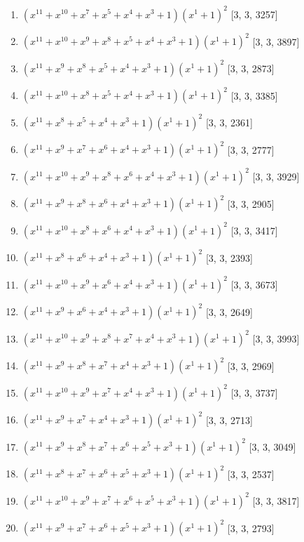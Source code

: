 \documentclass[10pt,twocolumn]{article}
\begin{document}
\begin{enumerate}
\item $(x^{11} + x^{10} + x^{7} + x^{5} + x^{4} + x^{3} + 1)(x^{1} + 1)^{2}$  [3, 3, 3257]
\item $(x^{11} + x^{10} + x^{9} + x^{8} + x^{5} + x^{4} + x^{3} + 1)(x^{1} + 1)^{2}$  [3, 3, 3897]
\item $(x^{11} + x^{9} + x^{8} + x^{5} + x^{4} + x^{3} + 1)(x^{1} + 1)^{2}$  [3, 3, 2873]
\item $(x^{11} + x^{10} + x^{8} + x^{5} + x^{4} + x^{3} + 1)(x^{1} + 1)^{2}$  [3, 3, 3385]
\item $(x^{11} + x^{8} + x^{5} + x^{4} + x^{3} + 1)(x^{1} + 1)^{2}$  [3, 3, 2361]
\item $(x^{11} + x^{9} + x^{7} + x^{6} + x^{4} + x^{3} + 1)(x^{1} + 1)^{2}$  [3, 3, 2777]
\item $(x^{11} + x^{10} + x^{9} + x^{8} + x^{6} + x^{4} + x^{3} + 1)(x^{1} + 1)^{2}$  [3, 3, 3929]
\item $(x^{11} + x^{9} + x^{8} + x^{6} + x^{4} + x^{3} + 1)(x^{1} + 1)^{2}$  [3, 3, 2905]
\item $(x^{11} + x^{10} + x^{8} + x^{6} + x^{4} + x^{3} + 1)(x^{1} + 1)^{2}$  [3, 3, 3417]
\item $(x^{11} + x^{8} + x^{6} + x^{4} + x^{3} + 1)(x^{1} + 1)^{2}$  [3, 3, 2393]
\item $(x^{11} + x^{10} + x^{9} + x^{6} + x^{4} + x^{3} + 1)(x^{1} + 1)^{2}$  [3, 3, 3673]
\item $(x^{11} + x^{9} + x^{6} + x^{4} + x^{3} + 1)(x^{1} + 1)^{2}$  [3, 3, 2649]
\item $(x^{11} + x^{10} + x^{9} + x^{8} + x^{7} + x^{4} + x^{3} + 1)(x^{1} + 1)^{2}$  [3, 3, 3993]
\item $(x^{11} + x^{9} + x^{8} + x^{7} + x^{4} + x^{3} + 1)(x^{1} + 1)^{2}$  [3, 3, 2969]
\item $(x^{11} + x^{10} + x^{9} + x^{7} + x^{4} + x^{3} + 1)(x^{1} + 1)^{2}$  [3, 3, 3737]
\item $(x^{11} + x^{9} + x^{7} + x^{4} + x^{3} + 1)(x^{1} + 1)^{2}$  [3, 3, 2713]
\item $(x^{11} + x^{9} + x^{8} + x^{7} + x^{6} + x^{5} + x^{3} + 1)(x^{1} + 1)^{2}$  [3, 3, 3049]
\item $(x^{11} + x^{8} + x^{7} + x^{6} + x^{5} + x^{3} + 1)(x^{1} + 1)^{2}$  [3, 3, 2537]
\item $(x^{11} + x^{10} + x^{9} + x^{7} + x^{6} + x^{5} + x^{3} + 1)(x^{1} + 1)^{2}$  [3, 3, 3817]
\item $(x^{11} + x^{9} + x^{7} + x^{6} + x^{5} + x^{3} + 1)(x^{1} + 1)^{2}$  [3, 3, 2793]

\end{enumerate}
\end{document}
